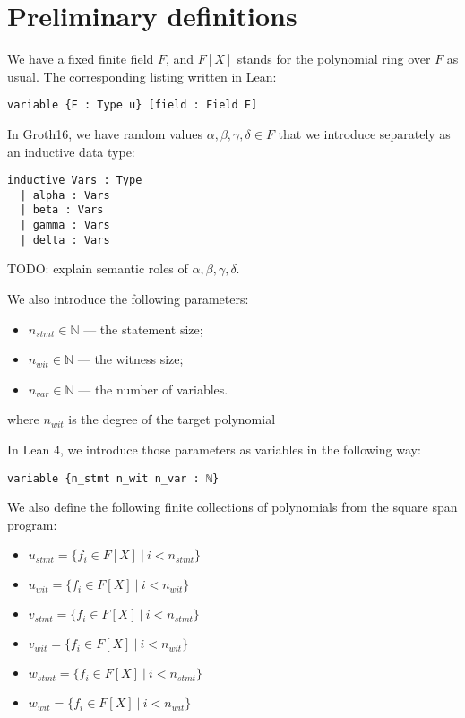 \documentclass{article}
\theoremstyle{definition}
\theoremstyle{remark}
\begin{document}
\section{Preliminary definitions}

We have a fixed finite field $F$, and $F[X]$ stands for the polynomial ring over $F$ as usual. The corresponding listing written in Lean:

\begin{lstlisting}
variable {F : Type u} [field : Field F]
\end{lstlisting}

In Groth16, we have random values $\alpha, \beta, \gamma, \delta \in F$ that we introduce separately as an inductive data type:
\begin{lstlisting}
inductive Vars : Type
  | alpha : Vars
  | beta : Vars
  | gamma : Vars
  | delta : Vars
\end{lstlisting}
TODO: explain semantic roles of $\alpha, \beta, \gamma, \delta$.

We also introduce the following parameters:

\begin{itemize}
\item $n_{stmt} \in \mathbb{N}$ --- the statement size;
\item $n_{wit} \in \mathbb{N}$ --- the witness size;
\item $n_{var} \in \mathbb{N}$ --- the number of variables.
\end{itemize}
where $n_{wit}$ is the degree of the target polynomial

In Lean 4, we introduce those parameters as variables in the following way:

\begin{lstlisting}
variable {n_stmt n_wit n_var : ℕ}
\end{lstlisting}

We also define the following finite collections of polynomials from the square span program:

\begin{itemize}
\item $u_{stmt} = \{ f_{i} \in F[X] \: | \: i < n_{stmt} \}$
\item $u_{wit} = \{ f_{i} \in F[X] \: | \: i < n_{wit} \}$
\item $v_{stmt} = \{ f_{i} \in F[X] \: | \: i < n_{stmt} \}$
\item $v_{wit} = \{ f_{i} \in F[X] \: | \: i < n_{wit} \}$
\item $w_{stmt} = \{ f_{i} \in F[X] \: | \: i < n_{stmt} \}$
\item $w_{wit} = \{ f_{i} \in F[X] \: | \: i < n_{wit} \}$
\end{itemize}
\end{document}

